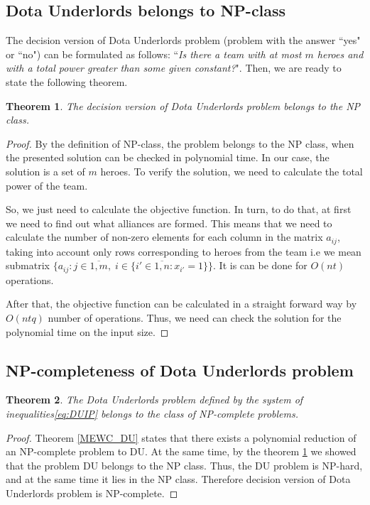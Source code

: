\documentclass{article}
\newtheorem{theorem}{Theorem}
\begin{document}
\subsection{Dota Underlords belongs to NP-class}
The decision version of Dota Underlords problem (problem with the answer ``yes" or ``no") can be formulated as follows: ``\textit{Is there a team with at most $ m $ heroes and with a total power greater than some given constant?}". Then, we are ready to state the following theorem.
\begin{theorem}
\label{DU_is_NP}
The decision version of Dota Underlords problem belongs to the  NP class.
\end{theorem}
\begin{proof}

By the definition of NP-class, the problem belongs to the NP class, when the presented solution can be checked in polynomial time. In our case, the solution is a set of $m$ heroes. To verify the solution, we need to calculate the total power of the team. 

So, we just need to calculate the objective function. In turn, to do that, at first we need to find out what alliances are formed. This means that we need to calculate the number of non-zero elements for each column in the matrix $a_{ij}$, taking into account only rows corresponding to heroes from the team i.e  we mean submatrix $\{a_{ij}:  j \in \overline{1,m},\; i \in \{  i' \in \overline{1,n} :   x_{i'} = 1 \}  \}$. It is can be done for $O(nt)$ operations. 

After that, the objective function can be calculated in a straight forward way by $O(ntq)$ number of operations. Thus, we need can check the solution for the polynomial time on the input size. 
\end{proof}

\subsection{NP-completeness of Dota Underlords problem}
\begin{theorem}
	The Dota Underlords problem defined by the system of inequalities\eqref{eq:DUIP}  belongs to the class of NP-complete problems.
\end{theorem}

\begin{proof}
Theorem \ref{MEWC_DU} states that there exists a polynomial reduction of an NP-complete problem to DU. At the same time, by the theorem \ref{DU_is_NP} we showed that the problem DU belongs to the NP class. Thus, the DU problem is NP-hard, and at the same time it lies in the NP class. Therefore decision version of Dota Underlords problem is NP-complete.	
\end{proof}
\end{document}
